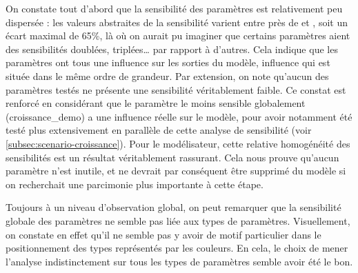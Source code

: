 On constate tout d'abord que la sensibilité des paramètres est relativement peu dispersée : les valeurs abstraites de la sensibilité varient entre près de \fg{} et \fg{}, soit un écart maximal de 65\%, là où on aurait pu imaginer que certains paramètres aient des sensibilités doublées, triplées\ldots{} par rapport à d'autres.
Cela indique que les paramètres ont tous une influence sur les sorties du modèle, influence qui est située dans le même ordre de grandeur.
Par extension, on note qu'aucun des paramètres testés ne présente une sensibilité véritablement faible.
Ce constat est renforcé en considérant que le paramètre le moins sensible globalement (\textsf{croissance\_demo}) a une influence réelle sur le modèle, pour avoir notamment été testé plus extensivement en parallèle de cette analyse de sensibilité (voir \cref{subsec:scenario-croissance}).
Pour le modélisateur, cette relative homogénéité des sensibilités est un résultat véritablement rassurant.
Cela nous prouve qu'aucun paramètre n'est inutile, et ne devrait par conséquent être supprimé du modèle si on recherchait une parcimonie plus importante à cette étape.

Toujours à un niveau d'observation global, on peut remarquer que la sensibilité globale des paramètres ne semble pas liée aux types de paramètres.
Visuellement, on constate en effet qu'il ne semble pas y avoir de motif particulier dans le positionnement des types représentés par les couleurs.
En cela, le choix de mener l'analyse indistinctement sur tous les types de paramètres semble avoir été le bon.

